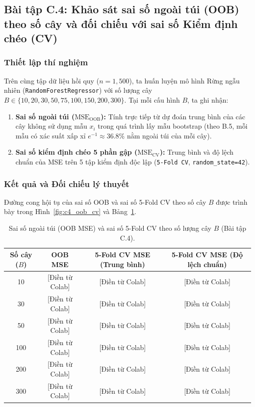 \subsection{Bài tập C.4: Khảo sát sai số ngoài túi (OOB) theo số cây và đối chiếu với sai số Kiểm định chéo (CV)}

\subsubsection{Thiết lập thí nghiệm}
Trên cùng tập dữ liệu hồi quy ($n = 1{,}500$), ta huấn luyện mô hình Rừng ngẫu nhiên (\texttt{RandomForestRegressor}) với số lượng cây $B \in \{10, 20, 30, 50, 75, 100, 150, 200, 300\}$. Tại mỗi cấu hình $B$, ta ghi nhận:
\begin{enumerate}
    \item \textbf{Sai số ngoài túi ($\text{MSE}_{\text{OOB}}$):} Tính trực tiếp từ dự đoán trung bình của các cây không sử dụng mẫu $x_i$ trong quá trình lấy mẫu bootstrap (theo B.5, mỗi mẫu có xác suất xấp xỉ $e^{-1} \approx 36.8\%$ nằm ngoài túi của mỗi cây).
    \item \textbf{Sai số kiểm định chéo 5 phần gập ($\text{MSE}_{\text{CV}}$):} Trung bình và độ lệch chuẩn của MSE trên 5 tập kiểm định độc lập (\texttt{5-Fold CV}, \texttt{random\_state=42}).
\end{enumerate}

\subsubsection{Kết quả và Đối chiếu lý thuyết}
Đường cong hội tụ của sai số OOB và sai số 5-Fold CV theo số cây $B$ được trình bày trong Hình~\ref{fig:c4_oob_cv} và Bảng~\ref{tab:c4_oob_cv}.

\begin{table}[htbp]
\centering
\caption{Sai số ngoài túi (OOB MSE) và sai số 5-Fold CV theo số lượng cây $B$ (Bài tập C.4).}
\label{tab:c4_oob_cv}
\begin{tabular}{cccc}
\hline
\textbf{Số cây ($B$)} & \textbf{OOB MSE} & \textbf{5-Fold CV MSE (Trung bình)} & \textbf{5-Fold CV MSE (Độ lệch chuẩn)} \\
\hline
10 & [Điền từ Colab] & [Điền từ Colab] & [Điền từ Colab] \\
30 & [Điền từ Colab] & [Điền từ Colab] & [Điền từ Colab] \\
50 & [Điền từ Colab] & [Điền từ Colab] & [Điền từ Colab] \\
100 & [Điền từ Colab] & [Điền từ Colab] & [Điền từ Colab] \\
200 & [Điền từ Colab] & [Điền từ Colab] & [Điền từ Colab] \\
300 & [Điền từ Colab] & [Điền từ Colab] & [Điền từ Colab] \\
\hline
\end{tabular}
\end{table}

